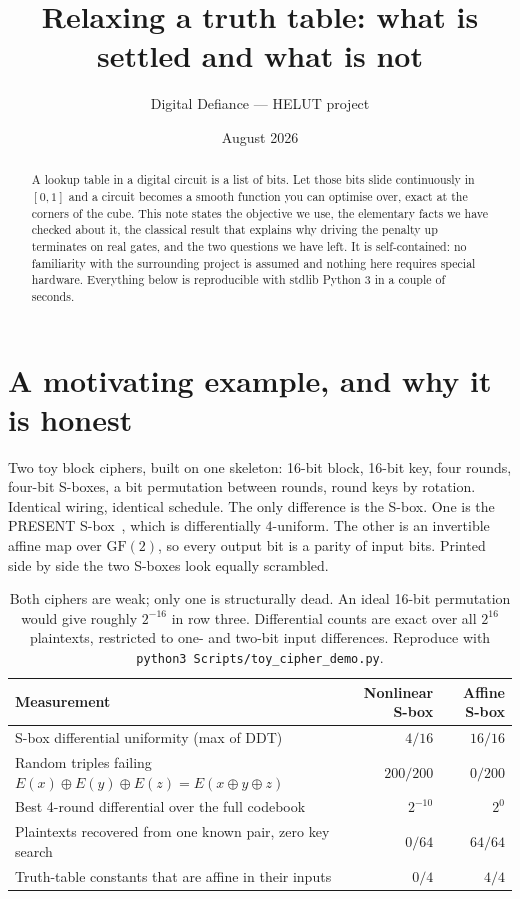 \documentclass[11pt,a4paper]{article}
\title{Relaxing a truth table: what is settled and what is not}
\author{Digital Defiance --- HELUT project}
\date{August 2026}
\begin{document}
\maketitle

\begin{abstract}
A lookup table in a digital circuit is a list of bits. Let those bits slide
continuously in $[0,1]$ and a circuit becomes a smooth function you can optimise
over, exact at the corners of the cube. This note states the objective we use, the
elementary facts we have checked about it, the classical result that explains why
driving the penalty up terminates on real gates, and the two questions we have
left. It is self-contained: no familiarity with the surrounding project is assumed
and nothing here requires special hardware. Everything below is reproducible with
stdlib Python 3 in a couple of seconds.
\end{abstract}

\section{A motivating example, and why it is honest}

Two toy block ciphers, built on one skeleton: 16-bit block, 16-bit key, four
rounds, four-bit S-boxes, a bit permutation between rounds, round keys by
rotation. Identical wiring, identical schedule. The only difference is the
S-box. One is the PRESENT S-box~\cite{present}, which is differentially
$4$-uniform. The other is an invertible affine map over $\mathrm{GF}(2)$, so
every output bit is a parity of input bits. Printed side by side the two S-boxes
look equally scrambled.

\begin{table}[h]
\centering
\small
\begin{tabular}{@{}lrr@{}}
\toprule
Measurement & Nonlinear S-box & Affine S-box \\
\midrule
S-box differential uniformity (max of DDT) & $4/16$ & $16/16$ \\
Random triples failing $E(x)\oplus E(y)\oplus E(z)=E(x\oplus y\oplus z)$ & $200/200$ & $0/200$ \\
Best 4-round differential over the full codebook & $2^{-10}$ & $2^{0}$ \\
Plaintexts recovered from one known pair, zero key search & $0/64$ & $64/64$ \\
Truth-table constants that are affine in their inputs & $0/4$ & $4/4$ \\
\bottomrule
\end{tabular}
\caption{Both ciphers are weak; only one is structurally dead. An ideal 16-bit
permutation would give roughly $2^{-16}$ in row three. Differential counts are
exact over all $2^{16}$ plaintexts, restricted to one- and two-bit input
differences. Reproduce with \texttt{python3 Scripts/toy\_cipher\_demo.py}.}
\end{table}
\end{document}
